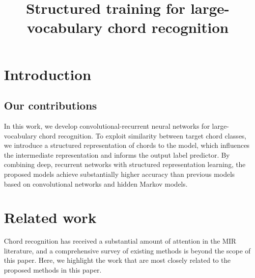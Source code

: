 \documentclass{article}
\title{Structured training for large-vocabulary chord recognition}
\begin{document}
%
\maketitle
%
\begin{abstract}
\end{abstract}
%
\section{Introduction}\label{sec:introduction}





\subsection{Our contributions}

In this work, we develop convolutional-recurrent neural networks for large-vocabulary chord recognition.
To exploit similarity between target chord classes, we introduce a structured representation of chords to the model, which influences the intermediate representation and informs the output label predictor.
By combining deep, recurrent networks with structured representation learning, the proposed models achieve substantially higher accuracy than previous models based on convolutional networks and hidden Markov models.

%
\section{Related work}

Chord recognition has received a substantial amount of attention in the MIR literature, and a comprehensive survey of existing methods is beyond the scope of this paper.
Here, we highlight the work that are most closely related to the proposed methods in this paper.
\end{document}
